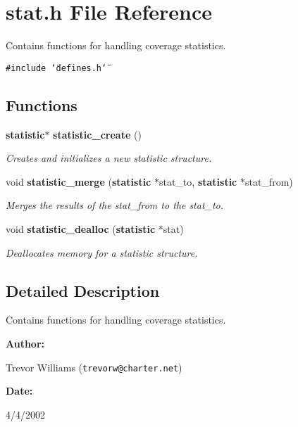 \section{stat.h File Reference}
\label{stat_8h}
Contains functions for handling coverage statistics. 


{\tt \#include \char`\"{}defines.h\char`\"{}}\par
\subsection*{Functions}
\begin{CompactItemize}
\item 
{\bf statistic}$\ast$ {\bf statistic\_\-create} ()
\begin{CompactList}\small\item\em Creates and initializes a new statistic structure.\item\end{CompactList}\item 
void {\bf statistic\_\-merge} ({\bf statistic} $\ast$stat\_\-to, {\bf statistic} $\ast$stat\_\-from)
\begin{CompactList}\small\item\em Merges the results of the stat\_\-from to the stat\_\-to.\item\end{CompactList}\item 
void {\bf statistic\_\-dealloc} ({\bf statistic} $\ast$stat)
\begin{CompactList}\small\item\em Deallocates memory for a statistic structure.\item\end{CompactList}\end{CompactItemize}


\subsection{Detailed Description}
Contains functions for handling coverage statistics.



\begin{Desc}
\item[{\bf Author: }]\par
Trevor Williams ({\tt trevorw@charter.net}) \end{Desc}
\begin{Desc}
\item[{\bf Date: }]\par
4/4/2002

\end{Desc}


